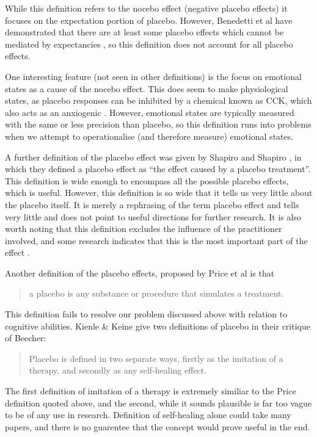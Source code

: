While this definition refers to the nocebo effect (negative placebo effects) it focuses on the expectation portion of placebo. However, Benedetti et al have demonstrated that there are at least some placebo effects which cannot be mediated by expectancies \cite{Benedetti2003a}, so this definition does not account for all placebo effects. 

One interesting feature (not seen in other definitions) is the focus on emotional states as a cause of the nocebo effect. This does seem to make physiological states, as placebo responses can be inhibited by a chemical known as CCK, which also acts as an anxiogenic \cite{Benedetti2006c}. However, emotional states are typically measured with the same or less precision than placebo, so this definition runs into problems when we attempt to operationalise (and therefore measure) emotional states. 

A further definition of the placebo effect was given by Shapiro and Shapiro \cite{Shapiro1997}, in which they defined a placebo effect as ``the effect caused by a placebo treatment''. This definition is wide enough to encompass all the possible placebo effects, which is useful. However, this definition is so wide that it tells us very little about the placebo itself. It is merely a rephrasing of the term placebo effect and tells very little and does not point to useful directions for further research. It is also worth noting that this definition excludes the influence of the practitioner involved, and some research indicates that this is the most important part of the effect \cite{Blasi2001,Kaptchuk2008}.


Another definition of the placebo effects,  proposed by Price et al \cite{Price2008} is that

\begin{quotation}
  a placebo is any substance or procedure that simulates a treatment.
\end{quotation}

This definition fails to resolve our problem discussed above with relation to cognitive abilities. 
Kienle \& Keine give two definitions of placebo in their critique of Beecher:

\begin{quotation}
Placebo is defined in two separate ways, firstly as the imitation of a
therapy, and secondly as any self-healing effect. 
\end{quotation}

The first definition of imitation of a therapy is extremely similiar to the Price definition quoted above, and the second, while it sounds plausible is far too vague to be of any use in research. Definition of self-healing alone could take many papers, and there is no guarentee that the concept would prove useful in the end. 

